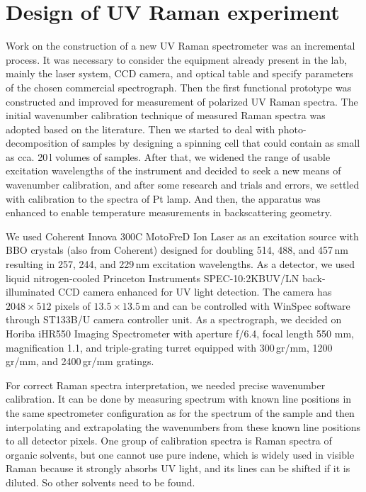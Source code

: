 \section{Design of UV Raman experiment}

Work on the construction of a new UV Raman spectrometer was an incremental
process.
It was necessary to consider the equipment already present in the lab, mainly
the laser system, CCD camera, and optical table and specify parameters of the
chosen commercial spectrograph.
Then the first functional prototype was constructed and improved for
measurement of polarized UV Raman spectra.
The initial wavenumber calibration technique of measured Raman spectra
was adopted based on the literature.
Then we started to deal with photo-decomposition of samples by designing a
spinning cell that could contain as small as cca. 20\,l volumes of
samples.
After that, we widened the range of usable excitation wavelengths of the
instrument and decided to seek a new means of wavenumber calibration, and
after some research and trials and errors, we settled with calibration to the
spectra of Pt lamp.
And then, the apparatus was enhanced to enable temperature measurements in
backscattering geometry.

We used Coherent Innova 300C MotoFreD\texttrademark{} Ion Laser as an
excitation source with BBO crystals (also from Coherent) designed for doubling
514, 488, and 457\,nm resulting in 257, 244, and 229\,nm excitation
wavelengths.
As a detector, we used liquid nitrogen-cooled Princeton Instruments
SPEC-10:2KBUV/LN back-illuminated CCD camera enhanced for UV light detection.
The camera has $2048\times512$ pixels of $13.5\times13.5$\,m and can
be controlled with WinSpec software through ST133B/U camera controller unit.
As a spectrograph, we decided on Horiba iHR550 Imaging Spectrometer with
aperture f/6.4, focal length 550 mm, magnification 1.1, and triple-grating
turret equipped with 300\,gr/mm, 1200\,gr/mm, and 2400\,gr/mm gratings.

\label{wavenumber_calibration}
For correct Raman spectra interpretation, we needed precise wavenumber
calibration.
It can be done by measuring spectrum with known line positions in the same
spectrometer configuration as for the spectrum of the sample and then
interpolating and extrapolating the wavenumbers from these known line positions
to all detector pixels.
One group of calibration spectra is Raman spectra of organic solvents, but one
cannot use pure indene, which is widely used in visible Raman because it
strongly absorbs UV light, and its lines can be shifted if it is diluted.
So other solvents need to be found.

